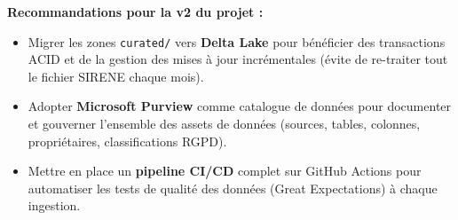 \documentclass[11pt,a4paper]{article}
\begin{document}
\textbf{Recommandations pour la v2 du projet :}
\begin{itemize}
  \item Migrer les zones \texttt{curated/} vers \textbf{Delta Lake} pour bénéficier des transactions ACID et de la gestion des mises à jour incrémentales (évite de re-traiter tout le fichier SIRENE chaque mois).
  \item Adopter \textbf{Microsoft Purview} comme catalogue de données pour documenter et gouverner l'ensemble des assets de données (sources, tables, colonnes, propriétaires, classifications RGPD).
  \item Mettre en place un \textbf{pipeline CI/CD} complet sur GitHub Actions pour automatiser les tests de qualité des données (Great Expectations) à chaque ingestion.
\end{itemize}
\end{document}
